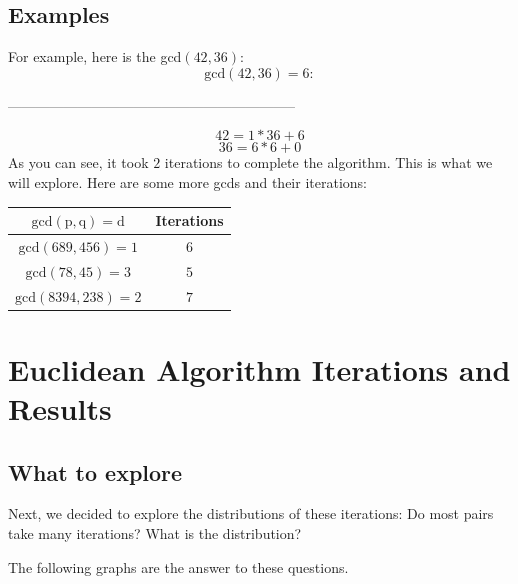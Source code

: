 \documentclass{beamer}
\begin{document}
\subsection{Examples}
\begin{frame}
For example, here is the gcd$(42,36)$:
		$$\mathrm{gcd}(42,36) = 6:$$

\begin{center}--------------------------------------------------------------
\end{center}	
	\begin{equation}
		42 = 1 * 36 + 6
	\end{equation}
	\begin{equation}
		36 = 6 * 6 + 0
	\end{equation}
As you can see, it took $2$ iterations to complete the algorithm. This is what we will explore. Here are some more gcds and their iterations:

\begin{center}
\begin{tabular}{c|c}

$\mathrm{gcd}(\mathrm{p},\mathrm{q}) = \mathrm{d}$ & Iterations
\\
\hline
$\mathrm{gcd}(689,456) = 1$ & $6$\\

$\mathrm{gcd}(78,45) = 3$ & $5$\\

$\mathrm{gcd}(8394,238) = 2$ & $7$\\


\end{tabular}
\end{center}
\end{frame}

\section{Euclidean Algorithm Iterations and Results}

\subsection{What to explore}
\begin{frame}
Next, we decided to explore the distributions of these iterations:
Do most pairs take many iterations? What is the distribution?

The following graphs are the answer to these questions.


\end{frame}
\end{document}
